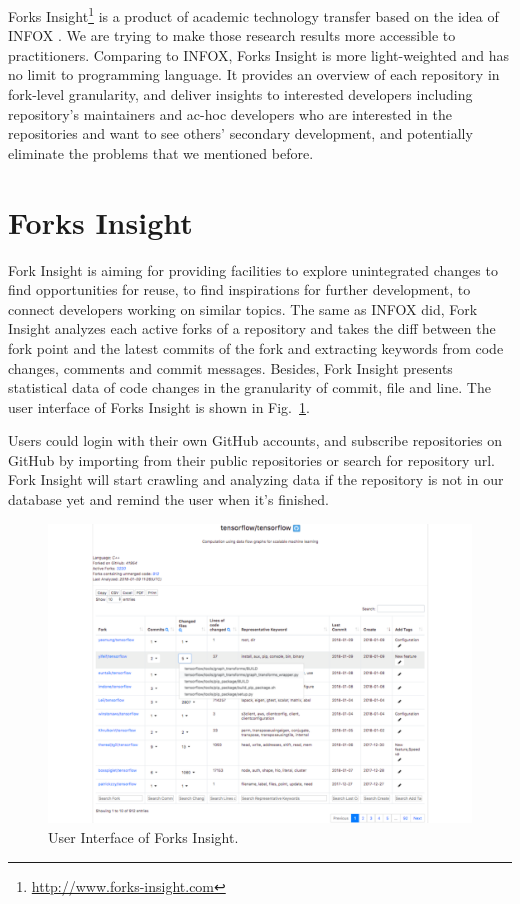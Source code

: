 Forks Insight\footnote{\url{http://www.forks-insight.com}} is a product of academic technology transfer based on the idea of INFOX \cite{ZSLXWK:ICSE18}. We are trying to make those research results more accessible to practitioners. Comparing to INFOX, Forks Insight is more light-weighted and has no limit to programming language. It provides an overview of each repository in fork-level granularity, and deliver insights to interested developers including repository's maintainers and ac-hoc developers who are interested in the repositories and want to see others' secondary development, and potentially eliminate the problems that we mentioned before.


\section{Forks Insight}

Fork Insight is aiming for providing facilities to explore unintegrated changes to find opportunities for reuse, to find inspirations for further development, to connect developers working on similar topics.
%
The same as INFOX did, Fork Insight analyzes each active forks of a repository and takes the diff between the fork point and the latest commits   of the fork and extracting keywords from code changes, comments and commit messages.
%
Besides, Fork Insight presents statistical data of code changes in the granularity of commit, file and line. The user interface of Forks Insight is shown in Fig.~\ref{GUI}. 


Users could login with their own GitHub accounts, and subscribe repositories on GitHub by importing from their public repositories or search for repository url. Fork Insight will start crawling and analyzing data if the repository is not in our database yet and remind the user when it's finished.

\begin{figure}[t]
\includegraphics[scale=0.3]{tensorflow_snapshot3.pdf}
\caption{User Interface of Forks Insight.}
	\vspace{-15pt}
	 \label{GUI}
\end{figure}

